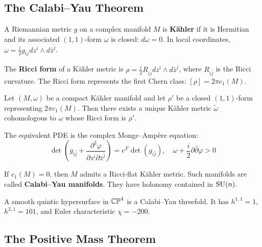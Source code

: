 \subsection{The Calabi--Yau Theorem}

\begin{definition}
A Riemannian metric $g$ on a complex manifold $M$ is \textbf{K\"ahler} if it is Hermitian and its associated $(1,1)$-form $\omega$ is closed: $d\omega = 0$. In local coordinates, $\omega = \frac{i}{2} g_{i\bar j} dz^i \wedge d\bar z^{\bar j}$.
\end{definition}

\begin{definition}
The \textbf{Ricci form} of a K\"ahler metric is $\rho = \frac{i}{2} R_{i\bar j} dz^i \wedge d\bar z^{\bar j}$, where $R_{i\bar j}$ is the Ricci curvature. The Ricci form represents the first Chern class: $[\rho] = 2\pi c_1(M)$.
\end{definition}

\begin{theorem}
Let $(M, \omega)$ be a compact K\"ahler manifold and let $\rho'$ be a closed $(1,1)$-form representing $2\pi c_1(M)$. Then there exists a unique K\"ahler metric $\tilde\omega$ cohomologous to $\omega$ whose Ricci form is $\rho'$.
\end{theorem}

The equivalent PDE is the complex Monge--Amp\`ere equation:
\[
\det\left(g_{i\bar j} + \frac{\partial^2 \varphi}{\partial z^i \partial \bar z^{\bar j}}\right) = e^{F} \det(g_{i\bar j}), \quad \omega + \frac{i}{2}\partial\bar\partial\varphi > 0
\]

\begin{corollary}
If $c_1(M) = 0$, then $M$ admits a Ricci-flat K\"ahler metric. Such manifolds are called \textbf{Calabi--Yau manifolds}. They have holonomy contained in $\operatorname{SU}(n)$.
\end{corollary}

\begin{example}
A smooth quintic hypersurface in $\mathbb{CP}^4$ is a Calabi--Yau threefold. It has $h^{1,1} = 1$, $h^{2,1} = 101$, and Euler characteristic $\chi = -200$.
\end{example}

\subsection{The Positive Mass Theorem}


